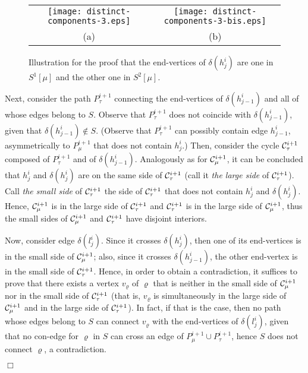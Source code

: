 \documentclass[letter,runningheads]{llncs}
\renewenvironment{proof}
{{\em Proof.\ }}{\hspace*{\fill}$\Box$\par\vspace{2mm}}
\begin{document}
\begin{proof}
\begin{itemize}
\begin{figure}[tb] 
\begin{center}
\begin{tabular}{c c}
\mbox{\texttt{[image: distinct-components-3.eps]}} \hspace{3mm} &
\mbox{\texttt{[image: distinct-components-3-bis.eps]}}\\
(a) \hspace{3mm} & (b)
\end{tabular}
\caption{Illustration for the proof that the end-vertices of $\delta(h^i_j)$ are one in $S^1[\mu]$ and the other one in $S^2[\mu]$.}
\label{fig:distinct-components-3}
\end{center}
\end{figure}

Next, consider the path $P^{i+1}_{\tau}$ connecting the end-vertices of $\delta(h^i_{j-1})$ and all of whose edges belong to $S$. Observe that $P^{i+1}_{\tau}$ does not coincide with $\delta(h^i_{j-1})$, given that $\delta(h^i_{j-1})\notin S$. (Observe that $P^{i+1}_{\tau}$ can possibly contain edge $h^i_{j-1}$, asymmetrically to  $P^{i+1}_{\mu}$ that does not contain $h^i_{j}$.)  Then, consider the cycle ${\cal C}^{i+1}_{\tau}$ composed of $P^{i+1}_{\tau}$ and of $\delta(h^i_{j-1})$. Analogously as for ${\cal C}^{i+1}_{\mu}$, it can be concluded that $h^i_{j}$ and $\delta(h^i_{j})$ are on the same side of ${\cal C}^{i+1}_{\tau}$ (call it {\em the large side} of ${\cal C}^{i+1}_{\tau}$). Call {\em the small side} of ${\cal C}^{i+1}_{\tau}$ the side of ${\cal C}^{i+1}_{\tau}$ that does not contain $h^i_{j}$ and $\delta(h^i_{j})$. Hence, ${\cal C}^{i+1}_{\mu}$ is in the large side of ${\cal C}^{i+1}_{\tau}$ and ${\cal C}^{i+1}_{\tau}$ is in the large side of ${\cal C}^{i+1}_{\mu}$, thus the small sides of  ${\cal C}^{i+1}_{\mu}$ and ${\cal C}^{i+1}_{\tau}$ have disjoint interiors.

Now, consider edge $\delta(l^i_j)$. Since it crosses $\delta(h^i_{j})$, then one of its end-vertices is in the small side of ${\cal C}^{i+1}_{\mu}$; also, since it crosses $\delta(h^i_{j-1})$, the other end-vertex is in the small side of ${\cal C}^{i+1}_{\tau}$. Hence, in order to obtain a contradiction, it suffices to prove that there exists a vertex $v_{\varrho}$ of $\varrho$ that is neither in the small side of  ${\cal C}^{i+1}_{\mu}$ nor in the small side of ${\cal C}^{i+1}_{\tau}$ (that is, $v_{\varrho}$ is simultaneously in the large side of  ${\cal C}^{i+1}_{\mu}$ and in the large side of  ${\cal C}^{i+1}_{\tau}$). In fact, if that is the case, then no path whose edges belong to $S$ can connect $v_{\varrho}$ with the end-vertices of $\delta(l^i_j)$, given that no con-edge for $\varrho$ in $S$ can cross an edge of $P^{i+1}_{\mu}\cup P^{i+1}_{\tau}$, hence $S$ does not connect $\varrho$, a contradiction.


\end{itemize}
\end{proof}
\end{document}
